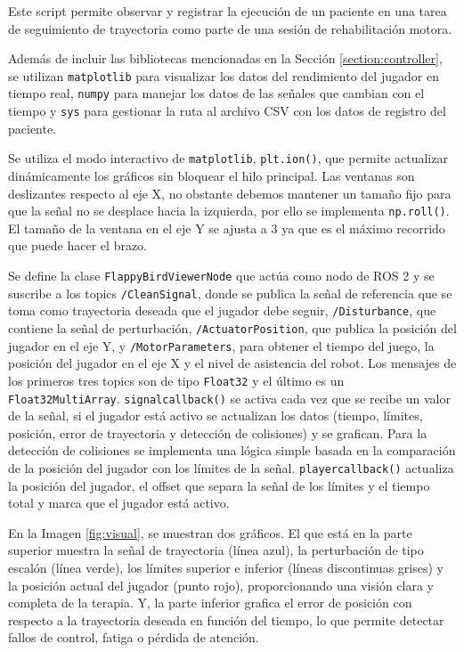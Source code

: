 Este script permite observar y registrar la ejecución de un paciente en una tarea de seguimiento de trayectoria como parte de una sesión de rehabilitación motora.

Además de incluir las bibliotecas mencionadas en la Sección \ref{section:controller}, se utilizan \verb|matplotlib| para visualizar los datos del rendimiento del jugador en tiempo real, \verb|numpy| para manejar los datos de las señales que cambian con el tiempo y \verb|sys| para gestionar la ruta al archivo CSV con los datos de registro del paciente.

Se utiliza el modo interactivo de \verb|matplotlib|, \verb|plt.ion()|, que permite actualizar dinámicamente los gráficos sin bloquear el hilo principal.
Las ventanas son deslizantes respecto al eje X, no obstante debemos mantener un tamaño fijo para que la señal no se desplace hacia la izquierda, por ello se implementa \verb|np.roll()|.
El tamaño de la ventana en el eje Y se ajusta a $3$ ya que es el máximo recorrido que puede hacer el brazo.

Se define la clase \verb|FlappyBirdViewerNode| que actúa como nodo de ROS 2 y se suscribe a los topics \verb|/CleanSignal|, donde se publica la señal de referencia que se toma como trayectoria deseada que el jugador debe seguir, \verb|/Disturbance|, que contiene la señal de perturbación, \verb|/ActuatorPosition|, que publica la posición del jugador en el eje Y, y \verb|/MotorParameters|, para obtener el tiempo del juego, la posición del jugador en el eje X y el nivel de asistencia del robot.
Los mensajes de los primeros tres topics son de tipo \verb|Float32| y el último es un \verb|Float32MultiArray|.
\verb|signalcallback()| se activa cada vez que se recibe un valor de la señal, si el jugador está activo se actualizan los datos (tiempo, límites, posición, error de trayectoria y detección de colisiones) y se grafican.
Para la detección de colisiones se implementa una lógica simple basada en la comparación de la posición del jugador con los límites de la señal.
\verb|playercallback()| actualiza la posición del jugador, el offset que separa la señal de los límites y el tiempo total y marca que el jugador está activo.

En la Imagen \ref{fig:visual}, se muestran dos gráficos.
El que está en la parte superior muestra la señal de trayectoria (línea azul), la perturbación de tipo escalón (línea verde), los límites superior e inferior (líneas discontinuas grises) y la posición actual del jugador (punto rojo), proporcionando una visión clara y completa de la terapia.
Y, la parte inferior grafica el error de posición con respecto a la trayectoria deseada en función del tiempo, lo que permite detectar fallos de control, fatiga o pérdida de atención.

